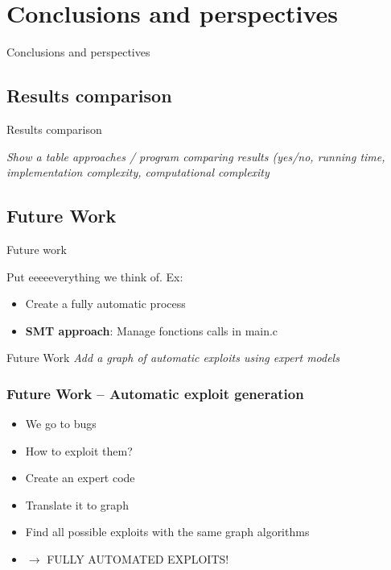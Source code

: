 \documentclass{beamer}
\begin{document}
\section{Conclusions and perspectives}

\begin{frame}
\centering
\LARGE Conclusions and perspectives
\end{frame}

\subsection{Results comparison}

\begin{frame}{Results comparison}

\textit{Show a table approaches / program comparing results (yes/no, running time, implementation complexity, computational complexity } \\

\end{frame}

\subsection{Future Work}
\begin{frame}{Future work}

Put eeeeeverything we think of. Ex:

\begin{itemize}
\item Create a fully automatic process
\item \textbf{SMT approach}: Manage fonctions calls in main.c 
\end{itemize}

\end{frame}

\begin{frame}{Future Work}
\textit{Add a graph of automatic exploits using expert models}
\end{frame}

\begin{frame}
\frametitle{Future Work -- Automatic exploit generation}
\begin{itemize}
\item We go to bugs
\item How to exploit them?
\item Create an expert code
\item Translate it to graph
\item Find all possible exploits with the same graph algorithms
\item $\to$ FULLY AUTOMATED EXPLOITS!
\end{itemize}
\end{frame}
\end{document}
